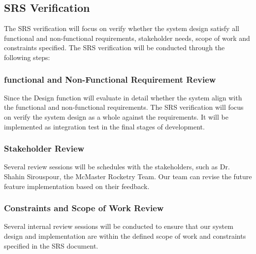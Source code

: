 \documentclass[12pt, titlepage]{article}
\begin{document}

\subsection{SRS Verification}

The SRS verification will focus on verify whether the system design satisfy all
functional and non-functional requirements, stakeholder needs, scope of work
and constraints specified. The SRS verification will be conducted through the
following steps:

\subsubsection{functional and Non-Functional Requirement Review}
Since the Design function will evaluate in detail whether the system align with
the functional and non-functional requirements. The SRS verification will focus
on verify the system design as a whole against the requirements. It will be
implemented as integration test in the final stages of development.

\subsubsection{Stakeholder Review}
Several review sessions will be schedules with the stakeholders, such as Dr.
Shahin Sirouspour, the McMaster Rocketry Team. Our team can revise the future
feature implementation based on their feedback.

\subsubsection{Constraints and Scope of Work Review}
Several internal review sessions will be conducted to ensure that our system
design and implementation are within the defined scope of work and constraints
specified in the SRS document.
\end{document}
